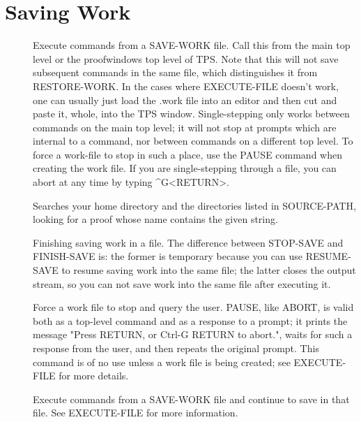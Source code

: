 \section{Saving Work}

\begin{description} 
\item[\parbox{\textwidth}{EXECUTE-FILE \textit{comfil} \textit{execprint} \textit{outfil} \textit{stepping}}]  
Execute commands from a SAVE-WORK file.
Call this from the main top level or the proofwindows top level of TPS.
Note that this will not save subsequent commands in the same file,
which distinguishes it from RESTORE-WORK.
In the cases where EXECUTE-FILE doesn't work, one can usually just 
load the .work file into an editor and then cut and paste it, whole, 
into the TPS window.
Single-stepping only works between commands on the main top level;
it will not stop at prompts which are internal to a command, nor between
commands on a different top level. To force a work-file to stop in
such a place, use the PAUSE command when creating the work file.
If you are single-stepping through a file, you can 
abort at any time by typing \textasciicircum G<RETURN>.

\item[\parbox{\textwidth}{FINDPROOF \textit{name}}]  
Searches your home directory and the directories listed in
SOURCE-PATH, looking for a proof whose name contains the given string.

\item[\parbox{\textwidth}{FINISH-SAVE}]  
Finishing saving work in a file.
The difference between STOP-SAVE and FINISH-SAVE is: 
the former is temporary because you can use RESUME-SAVE
to resume saving work into the same file; the latter closes 
the output stream, so you can not save work into the same 
file after executing it.

\item[\parbox{\textwidth}{PAUSE}]  
Force a work file to stop and query the user. PAUSE, like ABORT, is valid
both as a top-level command and as a response to a prompt; it prints the 
message "Press RETURN, or Ctrl-G RETURN to abort.", waits for such a response 
from the user, and then repeats the original prompt.
This command is of no use unless a work file is being created; see EXECUTE-FILE 
for more details.

\item[\parbox{\textwidth}{RESTORE-WORK \textit{comfil} \textit{execprint} \textit{outfil}}]  
Execute commands from a SAVE-WORK file and continue
to save in that file. See EXECUTE-FILE for more information.


\end{description}
